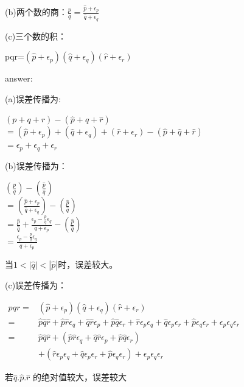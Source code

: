 \documentclass[UTF8]{ctexart}
\begin{document}
(b)两个数的商：$ \frac{p}{q} = \frac{\hat{p}+\epsilon_{p}}{\hat{q}+\epsilon_{q}}$


(c)三个数的积：

\quad \quad pqr=$(\hat{p}+\epsilon_{p})(\hat{q}+\epsilon_{q})(\hat{r}+\epsilon_{r}) $


answer:


(a)误差传播为:

 $ (p+q+r)-(\hat{p}+\hat{q}+\hat{r}) $~\\
 \quad$=(\hat{p}+\epsilon_{p})+(\hat{q}+\epsilon_{q})+(\hat{r}+\epsilon_{r})-(\hat{p}+\hat{q}+\hat{r})$~\\ 
\quad$=\epsilon_{p}+\epsilon_{q}+\epsilon_{r} $

(b)误差传播为：

 $ (\frac{p}{q})-(\frac{\hat{p}}{\hat{q}}) $~\\
 \quad$= (\frac{\hat{p}+\epsilon_{p}}{\hat{q}+\epsilon_{q}})-(\frac{\hat{p}}{\hat{q}})$~\\ 
\quad$=\frac{\hat{p}}{\hat{q}} + \frac{\epsilon_{p} - \frac{p}{q}\epsilon_{q} }{q+\epsilon_{p}} -(\frac{\hat{p}}{\hat{q}})$~\\
\quad $ = \frac{\epsilon_{p} - \frac{p}{q}\epsilon_{q} }{q+\epsilon_{p}}$

当$ 1<|\hat{q}|<|\hat{p}|$时，误差较大。

(c)误差传播为：

$\begin{aligned} p q r=&\left(\hat{p}+\epsilon_{p}\right)\left(\hat{q}+\epsilon_{q}\right)\left(\hat{r}+\epsilon_{r}\right) \\=& \hat{p} \hat{q} \hat{r}+\hat{p} \hat{r} \epsilon_{q}+\hat{q} \hat{r} \epsilon_{p}+\hat{p} \hat{q} \epsilon_{r}+\hat{r} \epsilon_{p} \epsilon_{q}+\hat{q} \epsilon_{p} \epsilon_{r}+\hat{p} \epsilon_{q} \epsilon_{r}+\epsilon_{p} \epsilon_{q} \epsilon_{r} \\=& \hat{p} \hat{q} \hat{r}+\left(\hat{p} \hat{r} \epsilon_{q}+\hat{q} \hat{r} \epsilon_{p}+\hat{p} \hat{q} \epsilon_{r}\right) \\ &+\left(\hat{r} \epsilon_{p} \epsilon_{q}+\hat{q} \epsilon_{p} \epsilon_{r}+\hat{p} \epsilon_{q} \epsilon_{r}\right)+\epsilon_{p} \epsilon_{q} \epsilon_{r} \end{aligned}$

若$ \hat{q}.\hat{p}.\hat{r}$ 的绝对值较大，误差较大


~\\
~\\
~\\
\end{document}
